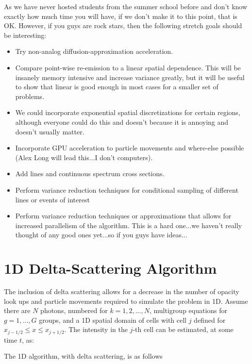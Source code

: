 \documentclass{article}
\newcommand{\xl}{{x_{j-1/2}}}
\newcommand{\xr}{{x_{j+1/2}}}
\begin{document}
As we have never hosted students from the summer school before and don't know
exactly how much time you will have, if we don't make
it to this point, that is OK.  However, if you guys are rock stars, then the
following stretch goals should be interesting:

\begin{itemize}

\item Try non-analog diffusion-approximation acceleration.
\item Compare point-wise re-emission to a linear spatial dependence.  This will
be insanely memory intensive and increase variance greatly, but it will be useful to show that linear is
good enough in most cases for a smaller set of problems.  
\item We could incorporate exponential spatial discretizations for certain
regions, although everyone could do this and doesn't because it is annoying and
doesn't usually matter.
\item Incorporate GPU acceleration to particle movements and where-else possible
(Alex Long will lead this...I don't computers).
\item Add lines and continuous spectrum cross sections.
\item Perform variance reduction techniques for conditional sampling of
different lines or events of interest
\item Perform variance reduction techniques or approximations that allows for increased
parallelism of the algorithm.  This is a hard one...we haven't really thought of
any good ones yet...so if you guys have ideas...

\end{itemize}

\section{1D Delta-Scattering Algorithm}

The inclusion of delta scattering allows for a decrease in the number of opacity
look ups and particle movements required to simulate the problem in 1D. Assume
there are $N$ photons, numbered for $k=1,2,\ldots,N$, multigroup equations for
$g=1,\ldots,G$ groups, and a 1D spatial domain of cells with cell $j$ defined
for $\xl \leq x \leq \xr$.  The intensity in the $j$-th cell can be estimated, at some time
$t$, as:




  The 1D
algorithm, with delta scattering, is as follows
\end{document}
